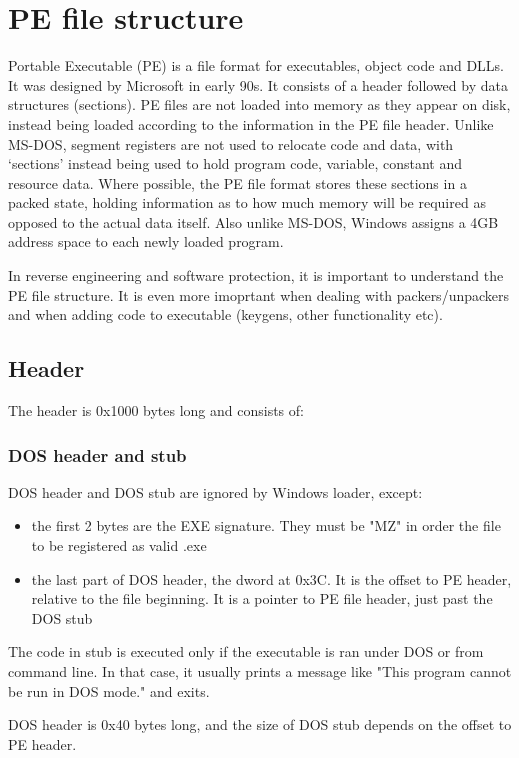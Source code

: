 \documentclass[a4paper,12pt]{article}
\begin{document}
\section{PE file structure}
Portable Executable (PE) is a file format for executables, object code and
DLLs. It was designed by Microsoft in early 90s. It consists of a header
followed by data structures (sections). PE files are not loaded into memory as
they appear on disk, instead being loaded according to the information in
the PE file header. Unlike MS-DOS, segment registers are not used to relocate
code and data, with ‘sections’ instead being used to hold program code,
variable, constant and resource data. Where possible, the PE file format
stores these sections in a packed state, holding information as to how much
memory will be required as opposed to the actual data itself. Also unlike
MS-DOS, Windows assigns a 4GB address space to each newly loaded program.

In reverse engineering and software protection, it is important to understand
the PE file structure. It is even more imoprtant when dealing with
packers/unpackers and when adding code to executable (keygens, other
functionality etc).

\subsection{Header}
The header is 0x1000 bytes long and consists of:

\subsubsection{DOS header and stub}
DOS header and DOS stub are ignored by Windows loader, except:

\begin{itemize}
\item the first 2 bytes are the EXE signature. They must be "MZ" in order
    the file to be registered as valid .exe
\item the last part of DOS header, the dword at 0x3C. It is the offset to
    PE header, relative to the file beginning. It is a pointer to PE file
    header, just past the DOS stub
\end{itemize}

The code in stub is executed only if the executable is ran under DOS or from
command line. In that case, it usually prints a message like "This program
cannot be run in DOS mode." and exits.

DOS header is 0x40 bytes long, and the size of DOS stub depends on the offset
to PE header.
\end{document}
